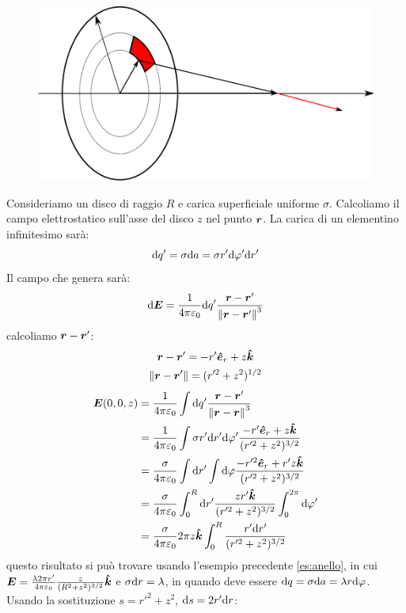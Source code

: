 \begin{Es}[Disco]
\begin{figure}[htbp]
 \centering
 \includegraphics[scale=0.8]{immagini/fisica2/disco}
\end{figure}
 Consideriamo un disco di raggio $R$ e carica superficiale uniforme $\sigma$. Calcoliamo il campo elettrostatico sull'asse del disco $z$ nel punto $\boldsymbol{r}$. La carica di un elementino infinitesimo sarà:
\begin{equation*}
 \mathrm{d} q' = \sigma\mathrm{d} a = \sigma r'\mathrm{d}\varphi'\mathrm{d} r'
\end{equation*}
Il campo che genera sarà:
\begin{equation*}
 \mathrm{d}\boldsymbol{E} = \frac{1}{4\pi\varepsilon_0}\mathrm{d} q'\frac{\boldsymbol{r}-\boldsymbol{r}'}{\left\lVert\boldsymbol{r}-\boldsymbol{r}'\right\rVert^3}
\end{equation*}
calcoliamo $\boldsymbol{r}-\boldsymbol{r}'$:
\begin{gather*}
 \boldsymbol{r}-\boldsymbol{r}'=-r' \boldsymbol{\hat {e}}_r + z\boldsymbol{\hat {k}}\\
 \left\lVert\boldsymbol{r}-\boldsymbol{r}'\right\rVert = (r'^2+z^2)^{1/2}
\end{gather*}
\begin{align*}
 \boldsymbol{E}(0,0,z) &= \frac{1}{4\pi\varepsilon_0}\int \mathrm{d} q'\frac{\boldsymbol{r}-\boldsymbol{r}'}{\left\lVert\boldsymbol{r}-\boldsymbol{r}\right\rVert^3}\\
 &=\frac{1}{4\pi\varepsilon_0}\int \sigma r'\mathrm{d} r'\mathrm{d}\varphi'\frac{-r'\boldsymbol{\hat {e}}_r+z\boldsymbol{\hat {k}}}{(r'^2+z^2)^{3/2}}\\
 &=\frac{\sigma}{4\pi\varepsilon_0}\int\mathrm{d} r'\int\mathrm{d}\varphi\frac{-r'^2\boldsymbol{\hat {e}}_r+r' z\boldsymbol{\hat {k}}}{(r'^2+z^2)^{3/2}}\\
 &=\frac{\sigma}{4\pi\varepsilon_0}\int_0^R \mathrm{d} r'\frac{zr'\boldsymbol{\hat {k}}}{(r'^2+z^2)^{3/2}}\int_0^{2\pi}\mathrm{d}\varphi'\\
 &=\frac{\sigma}{4\pi\varepsilon_0}2\pi z\boldsymbol{\hat {k}}\int_0^R\frac{r'\mathrm{d} r'}{(r'^2+z^2)^{3/2}}
\end{align*}
questo risultato si può trovare usando l'esempio precedente \ref{es:anello}, in cui $\boldsymbol{E} = \frac{\lambda 2\pi r'}{4\pi\varepsilon_0}\frac{z}{(R^2+z^2)^{3/2}}\boldsymbol{\hat {k}}$ e $\sigma\mathrm{d} r=\lambda$, in quando deve essere $\mathrm{d} q = \sigma\mathrm{d} a=\lambda r \mathrm{d} \varphi$. Usando la sostituzione $s = r'^2+z^2$, $\mathrm{d} s = 2r'\mathrm{d} r$:

\end{Es}
